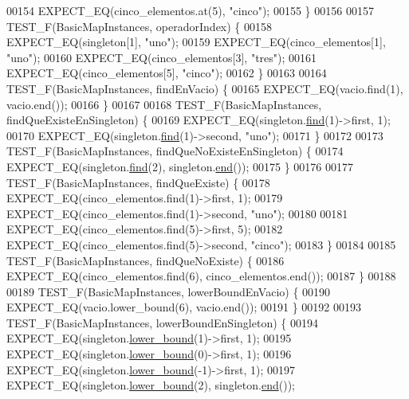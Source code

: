\begin{DoxyCode}
00154     EXPECT\_EQ(cinco\_elementos.at(5), \textcolor{stringliteral}{"cinco"});
00155 \}
00156 
00157 TEST\_F(BasicMapInstances, operadorIndex) \{
00158     EXPECT\_EQ(singleton[1], \textcolor{stringliteral}{"uno"});
00159     EXPECT\_EQ(cinco\_elementos[1], \textcolor{stringliteral}{"uno"});
00160     EXPECT\_EQ(cinco\_elementos[3], \textcolor{stringliteral}{"tres"});
00161     EXPECT\_EQ(cinco\_elementos[5], \textcolor{stringliteral}{"cinco"});
00162 \}
00163 
00164 TEST\_F(BasicMapInstances, findEnVacio) \{
00165     EXPECT\_EQ(vacio.find(1), vacio.end());
00166 \}
00167 
00168 TEST\_F(BasicMapInstances, findQueExisteEnSingleton) \{
00169     EXPECT\_EQ(singleton.\hyperlink{classaed2_1_1map_afd0fc1a8234888e61e0e615de7e245b8_afd0fc1a8234888e61e0e615de7e245b8}{find}(1)->first, 1);
00170     EXPECT\_EQ(singleton.\hyperlink{classaed2_1_1map_afd0fc1a8234888e61e0e615de7e245b8_afd0fc1a8234888e61e0e615de7e245b8}{find}(1)->second, \textcolor{stringliteral}{"uno"});
00171 \}
00172 
00173 TEST\_F(BasicMapInstances, findQueNoExisteEnSingleton) \{
00174     EXPECT\_EQ(singleton.\hyperlink{classaed2_1_1map_afd0fc1a8234888e61e0e615de7e245b8_afd0fc1a8234888e61e0e615de7e245b8}{find}(2), singleton.\hyperlink{classaed2_1_1map_a76023e6a56cb625513e1b5ea028bf983_a76023e6a56cb625513e1b5ea028bf983}{end}());
00175 \}
00176 
00177 TEST\_F(BasicMapInstances, findQueExiste) \{
00178     EXPECT\_EQ(cinco\_elementos.find(1)->first, 1);
00179     EXPECT\_EQ(cinco\_elementos.find(1)->second, \textcolor{stringliteral}{"uno"});
00180 
00181     EXPECT\_EQ(cinco\_elementos.find(5)->first, 5);
00182     EXPECT\_EQ(cinco\_elementos.find(5)->second, \textcolor{stringliteral}{"cinco"});
00183 \}
00184 
00185 TEST\_F(BasicMapInstances, findQueNoExiste) \{
00186     EXPECT\_EQ(cinco\_elementos.find(6), cinco\_elementos.end());
00187 \}
00188 
00189 TEST\_F(BasicMapInstances, lowerBoundEnVacio) \{
00190     EXPECT\_EQ(vacio.lower\_bound(6), vacio.end());
00191 \}
00192 
00193 TEST\_F(BasicMapInstances, lowerBoundEnSingleton) \{
00194     EXPECT\_EQ(singleton.\hyperlink{classaed2_1_1map_a3399d36fdd5a880b494f3a5795d3f18f_a3399d36fdd5a880b494f3a5795d3f18f}{lower_bound}(1)->first, 1);
00195     EXPECT\_EQ(singleton.\hyperlink{classaed2_1_1map_a3399d36fdd5a880b494f3a5795d3f18f_a3399d36fdd5a880b494f3a5795d3f18f}{lower_bound}(0)->first, 1);
00196     EXPECT\_EQ(singleton.\hyperlink{classaed2_1_1map_a3399d36fdd5a880b494f3a5795d3f18f_a3399d36fdd5a880b494f3a5795d3f18f}{lower_bound}(-1)->first, 1);
00197     EXPECT\_EQ(singleton.\hyperlink{classaed2_1_1map_a3399d36fdd5a880b494f3a5795d3f18f_a3399d36fdd5a880b494f3a5795d3f18f}{lower_bound}(2), singleton.\hyperlink{classaed2_1_1map_a76023e6a56cb625513e1b5ea028bf983_a76023e6a56cb625513e1b5ea028bf983}{end}());

\end{DoxyCode}
